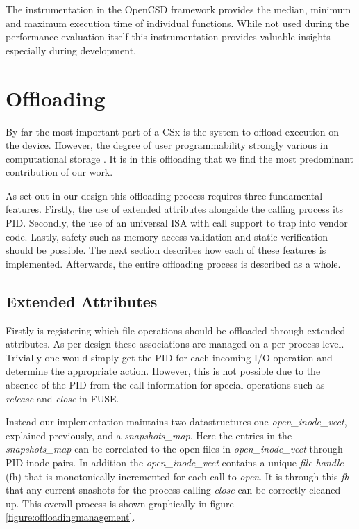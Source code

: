 The instrumentation in the OpenCSD framework provides the median, minimum and
maximum execution time of individual functions. While not used during the
performance evaluation itself this instrumentation provides valuable insights
especially during development.

\section{Offloading}

By far the most important part of a CSx is the system to offload execution on
the device. However, the degree of user programmability strongly various in
computational storage \cite{lukken2021past}. It is in this offloading that we
find the most predominant contribution of our work.

As set out in our design this offloading process requires three fundamental
features. Firstly, the use of extended attributes alongside the calling process
its PID. Secondly, the use of an universal ISA with call support to trap
into vendor code. Lastly, safety such as memory access validation and static
verification should be possible. The next section describes how each of these
features is implemented. Afterwards, the entire offloading process is described
as a whole.

\subsection{Extended Attributes}
\label{extended-attributes}

Firstly is registering which file operations should be offloaded through
extended attributes. As per design these associations are managed on a per
process level. Trivially one would simply get the PID for each incoming I/O
operation and determine the appropriate action. However, this is not
possible due to the absence of the PID from the call information for special
operations such as \textit{release} and \textit{close} in FUSE. 

Instead our implementation maintains two datastructures one 
\textit{open\_inode\_vect}, explained previously, and a \textit{snapshots\_map}.
Here the entries in the \textit{snapshots\_map} can be correlated to the open
files in \textit{open\_inode\_vect} through PID inode pairs. In addition the
\textit{open\_inode\_vect} contains a unique \textit{file handle} (fh) that is
monotonically incremented for each call to \textit{open}. It is through this
\textit{fh} that any current snashots for the process calling \textit{close}
can be correctly cleaned up. This overall process is shown graphically in
figure \ref{figure:offloadingmanagement}.

